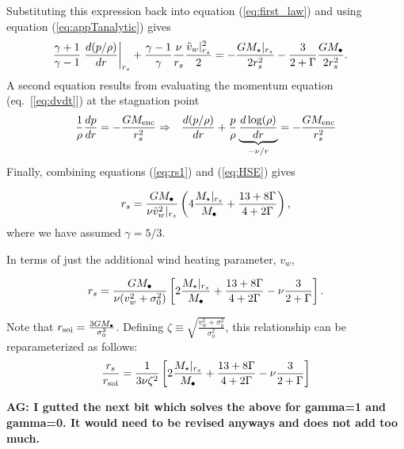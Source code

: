 Substituting this expression back into equation (\ref{eq:first_law}) and using equation (\ref{eq:appTanalytic}) gives
\begin{align}
&\frac{\gamma+1}{\gamma-1}
\left.\frac{d (p/\rho)}{d r}\right|_{r_s}+ \frac{\gamma-1}{\gamma} \frac{\nu}{r_s} \frac{\tilde{v}_{w}|_{r_s}^{2}}{2} = -\frac{G
  M_{\star}|_{r_s}}{2 r_s^2} -\frac{3}{2+\Gamma} \frac{G M_{\bullet}}{2 r_s^2}.  \label{eq:rs1}
\end{align}
A second equation results from evaluating the momentum equation (eq.~[\ref{eq:dvdt}]) at the stagnation point
\begin{align}
&\frac{1}{\rho}\frac{d p}{d r}=- \frac{GM_{\rm enc}}{r_s^2} \Rightarrow
&\frac{d (p/\rho)}{d r}+\frac{p}{\rho}
\underbrace{\frac{d\log(\rho)}{dr}}_{-\nu/r} = -\frac{G M_{\rm enc}}{r_s^2} \label{eq:HSE}
\end{align}
Finally, combining equations (\ref{eq:rs1}) and (\ref{eq:HSE}) gives 

\begin{align}
r_s=\frac{G M_{\bullet}}{\nu \tilde{v}_{w}^{2}|_{r_s}}\left(4
  \frac{M_{\star}|_{r_s}}{M_{\bullet}} +\frac{13+ 8\Gamma}{4+2\Gamma}\right),
\end{align}
where we have assumed $\gamma=5/3$.

In terms of just the additional wind heating parameter, $v_w$,

\begin{align}
  r_s=\frac{G M_{\bullet}}{\nu (v_w^{2}+\sigma_0^2)}\left[2
    \frac{M_{\star}|_{r_s}}{M_{\bullet}} +\frac{13+ 8\Gamma}{4+2\Gamma}-\nu \frac{3}{2+\Gamma}\right].
\label{eq:rs2main}
\end{align}

Note that $r_{\rm soi}=\frac{3 G M_{\bullet}}{\sigma_0^2}$. Defining $\zeta \equiv
\sqrt{\frac{v_w^2+\sigma_0^2}{\sigma_0^2}}$, this relationship can be reparameterized as
follows:
\begin{align}
  \frac{r_s}{r_{\rm soi}}=\frac{1}{3\nu \zeta^2} \left[2\frac{M_{\star}|_{r_s}}{M_{\bullet}} +\frac{13+8\Gamma}{4+2\Gamma}-\nu \frac{3}{2+\Gamma}\right]
  \label{eq:rsRinf}
\end{align}

{\bf AG: I gutted the next bit which solves the above for gamma=1 and
  gamma=0. It would need to be revised anyways and does not add too much.}

